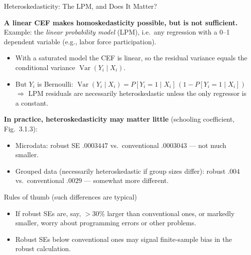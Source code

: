 \documentclass[aspectratio=169,11pt]{beamer}
\newcommand{\Var}{\operatorname{Var}}
\begin{document}
\begin{frame}{Heteroskedasticity: The LPM, and Does It Matter?}
\small

\textbf{A linear CEF makes homoskedasticity possible, but is not
sufficient.} Example: the \emph{linear probability model} (LPM), i.e.\ any
regression with a 0--1 dependent variable (e.g., labor force
participation).
\begin{itemize}
    \item With a saturated model the CEF is linear, so the residual variance
    equals the conditional variance $\Var(Y_i\mid X_i)$.
    \item But $Y_i$ is Bernoulli:
    $\Var(Y_i\mid X_i)=P[Y_i=1\mid X_i]\,(1-P[Y_i=1\mid X_i])$
    $\Rightarrow$ LPM residuals are necessarily heteroskedastic unless the
    only regressor is a constant.
\end{itemize}

\medskip

\textbf{In practice, heteroskedasticity may matter little} (schooling
coefficient, Fig.\ 3.1.3):
\begin{itemize}
    \item Microdata: robust SE $.0003447$ vs.\ conventional $.0003043$ ---
    not much smaller.
    \item Grouped data (necessarily heteroskedastic if group sizes differ):
    robust $.004$ vs.\ conventional $.0029$ --- somewhat more different.
\end{itemize}

\begin{alertblock}{Rules of thumb (such differences are typical)}
\begin{itemize}
    \item If robust SEs are, say, $>30\%$ larger than conventional ones, or
    markedly smaller, worry about programming errors or other problems.
    \item Robust SEs below conventional ones may signal finite-sample bias in
    the robust calculation.
\end{itemize}
\end{alertblock}

\end{frame}
\end{document}
